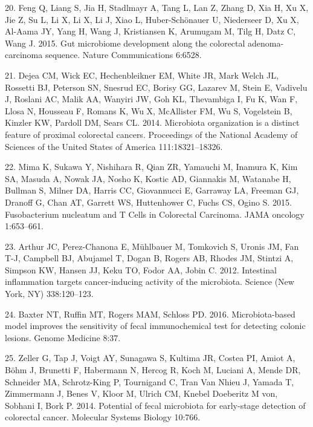 \documentclass[12pt,]{article}
\begin{document}
\hypertarget{ref-feng_gut_2015}{}
20. Feng Q, Liang S, Jia H, Stadlmayr A, Tang L, Lan Z, Zhang D, Xia H,
Xu X, Jie Z, Su L, Li X, Li X, Li J, Xiao L, Huber-Schönauer U,
Niederseer D, Xu X, Al-Aama JY, Yang H, Wang J, Kristiansen K, Arumugam
M, Tilg H, Datz C, Wang J. 2015. Gut microbiome development along the
colorectal adenoma-carcinoma sequence. Nature Communications 6:6528.

\hypertarget{ref-dejea_microbiota_2014}{}
21. Dejea CM, Wick EC, Hechenbleikner EM, White JR, Mark Welch JL,
Rossetti BJ, Peterson SN, Snesrud EC, Borisy GG, Lazarev M, Stein E,
Vadivelu J, Roslani AC, Malik AA, Wanyiri JW, Goh KL, Thevambiga I, Fu
K, Wan F, Llosa N, Housseau F, Romans K, Wu X, McAllister FM, Wu S,
Vogelstein B, Kinzler KW, Pardoll DM, Sears CL. 2014. Microbiota
organization is a distinct feature of proximal colorectal cancers.
Proceedings of the National Academy of Sciences of the United States of
America 111:18321--18326.

\hypertarget{ref-mima_fusobacterium_2015}{}
22. Mima K, Sukawa Y, Nishihara R, Qian ZR, Yamauchi M, Inamura K, Kim
SA, Masuda A, Nowak JA, Nosho K, Kostic AD, Giannakis M, Watanabe H,
Bullman S, Milner DA, Harris CC, Giovannucci E, Garraway LA, Freeman GJ,
Dranoff G, Chan AT, Garrett WS, Huttenhower C, Fuchs CS, Ogino S. 2015.
Fusobacterium nucleatum and T Cells in Colorectal Carcinoma. JAMA
oncology 1:653--661.

\hypertarget{ref-arthur_intestinal_2012}{}
23. Arthur JC, Perez-Chanona E, Mühlbauer M, Tomkovich S, Uronis JM, Fan
T-J, Campbell BJ, Abujamel T, Dogan B, Rogers AB, Rhodes JM, Stintzi A,
Simpson KW, Hansen JJ, Keku TO, Fodor AA, Jobin C. 2012. Intestinal
inflammation targets cancer-inducing activity of the microbiota. Science
(New York, NY) 338:120--123.

\hypertarget{ref-baxter_microbiota-based_2016}{}
24. Baxter NT, Ruffin MT, Rogers MAM, Schloss PD. 2016. Microbiota-based
model improves the sensitivity of fecal immunochemical test for
detecting colonic lesions. Genome Medicine 8:37.

\hypertarget{ref-zeller_potential_2014}{}
25. Zeller G, Tap J, Voigt AY, Sunagawa S, Kultima JR, Costea PI, Amiot
A, Böhm J, Brunetti F, Habermann N, Hercog R, Koch M, Luciani A, Mende
DR, Schneider MA, Schrotz-King P, Tournigand C, Tran Van Nhieu J, Yamada
T, Zimmermann J, Benes V, Kloor M, Ulrich CM, Knebel Doeberitz M von,
Sobhani I, Bork P. 2014. Potential of fecal microbiota for early-stage
detection of colorectal cancer. Molecular Systems Biology 10:766.
\end{document}
